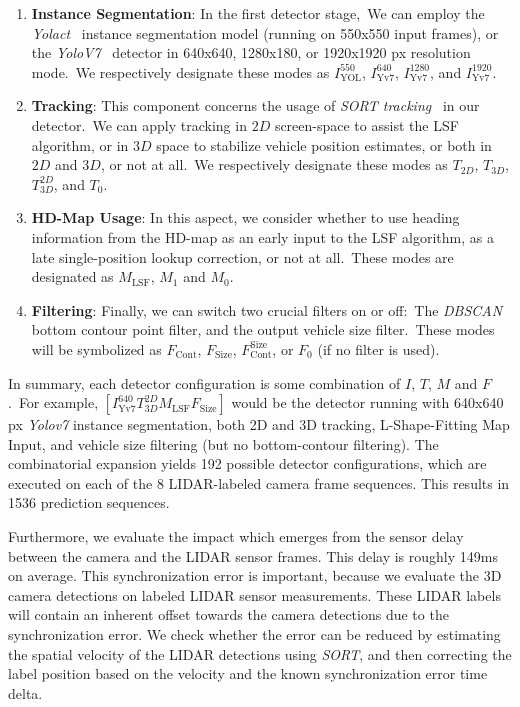 \begin{enumerate}
    \item \textbf{Instance Segmentation}: In the first detector stage,\ We can employ the \textit{Yolact}~\cite{liu2021yolactedge} instance segmentation model (running on 550x550 input frames), or the \textit{YoloV7}~\cite{wang2022yolov7} detector in 640x640, 1280x180, or 1920x1920 px resolution mode.\ We respectively designate these modes as $I^{550}_\text{YOL}$, $I^{640}_\text{Yv7}$, $I^{1280}_\text{Yv7}$, and $I^{1920}_\text{Yv7}$.
    \item \textbf{Tracking}: This component concerns the usage of \textit{SORT tracking}~\cite{bewley2016simple} in our detector.\ We can apply tracking in $2D$ screen-space to assist the LSF algorithm, or in $3D$ space to stabilize vehicle position estimates, or both in $2D$ and $3D$, or not at all.\ We respectively designate these modes as $T_{2D}$, $T_{3D}$, $T^{2D}_{3D}$, and $T_0$.
    \item \textbf{HD-Map Usage}: In this aspect, we consider whether to use heading information from the HD-map as an early input to the LSF algorithm, as a late single-position lookup correction, or not at all.\ These modes are designated as $M_\text{LSF}$, $M_1$ and $M_0$.
    \item \textbf{Filtering}: Finally, we can switch two crucial filters on or off:\ The \textit{DBSCAN}~\cite{schubert2017dbscan} bottom contour point filter, and the output vehicle size filter.\ These modes will be symbolized as $F_\text{Cont}$, $F_\text{Size}$, $F_\text{Cont}^\text{Size}$, or $F_0$ (if no filter is used).
\end{enumerate}

In summary, each detector configuration is some combination of $I$, $T$, $M$ and $F$.\ For example, $\left[I^{640}_\text{Yv7}T^{2D}_{3D}M_\text{LSF}F_\text{Size}\right]$ would be the detector running with 640x640 px \textit{Yolov7} instance segmentation, both 2D and 3D tracking, L-Shape-Fitting Map Input, and vehicle size filtering (but no bottom-contour filtering).
The combinatorial expansion yields 192 possible detector configurations, which are executed on each of the 8 LIDAR-labeled camera frame sequences.
This results in 1536 prediction sequences.

Furthermore, we evaluate the impact which emerges from the sensor delay between the camera and the LIDAR sensor frames.
This delay is roughly 149ms on average.
This synchronization error is important, because we evaluate the 3D camera detections on labeled LIDAR sensor measurements.
These LIDAR labels will contain an inherent offset towards the camera detections due to the synchronization error.
We check whether the error can be reduced by estimating the spatial velocity of the LIDAR detections using \textit{SORT}, and then correcting the label position based on the velocity and the known synchronization error time delta.

